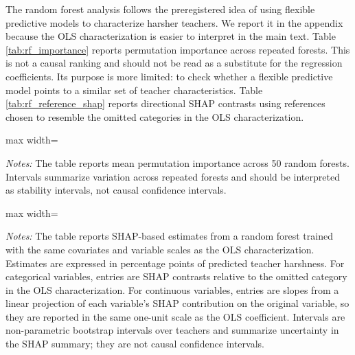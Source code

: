 \documentclass[12pt,a4paper]{article}
\newcommand{\tabpath}{../3. Output/tables/}
\begin{document}
The random forest analysis follows the preregistered idea of using flexible predictive models to characterize harsher teachers. We report it in the appendix because the OLS characterization is easier to interpret in the main text. Table \ref{tab:rf_importance} reports permutation importance across repeated forests. This is not a causal ranking and should not be read as a substitute for the regression coefficients. Its purpose is more limited: to check whether a flexible predictive model points to a similar set of teacher characteristics. Table \ref{tab:rf_reference_shap} reports directional SHAP contrasts using references chosen to resemble the omitted categories in the OLS characterization.

\begin{table}[H]
\centering
\caption{Random forest permutation importance for teacher harshness}
\label{tab:rf_importance}
\begin{adjustbox}{max width=\textwidth}

\end{adjustbox}
\begin{minipage}{0.92\textwidth}
\footnotesize \textit{Notes:} The table reports mean permutation importance across 50 random forests. Intervals summarize variation across repeated forests and should be interpreted as stability intervals, not causal confidence intervals.
\end{minipage}
\end{table}

\begin{table}[H]
\centering
\caption{Reference-normalized SHAP contrasts for teacher harshness}
\label{tab:rf_reference_shap}
\begin{adjustbox}{max width=\textwidth}

\end{adjustbox}
\begin{minipage}{0.92\textwidth}
\footnotesize \textit{Notes:} The table reports SHAP-based estimates from a random forest trained with the same covariates and variable scales as the OLS characterization. Estimates are expressed in percentage points of predicted teacher harshness. For categorical variables, entries are SHAP contrasts relative to the omitted category in the OLS characterization. For continuous variables, entries are slopes from a linear projection of each variable's SHAP contribution on the original variable, so they are reported in the same one-unit scale as the OLS coefficient. Intervals are non-parametric bootstrap intervals over teachers and summarize uncertainty in the SHAP summary; they are not causal confidence intervals.
\end{minipage}
\end{table}
\end{document}
